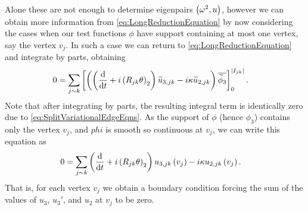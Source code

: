 Alone these are not enough to determine eigenpairs $\left( \omega^2, u \right)$, however we can obtain more information from \eqref{eq:LongReductionEquation} by now considering the cases when our test functions $\phi$ have support containing at most one vertex, say the vertex $v_j$.
In such a case we can return to \eqref{eq:LongReductionEquation} and integrate by parts, obtaining 
\begin{align*}
	0 &= \sum_{j\sim k} \left[  \left(  \left( \dfrac{\mathrm{d}}{\mathrm{d}t} + i\left( R_{jk}\theta \right)_2 \right)\widetilde{u}_{3,jk} - i\kappa\widetilde{u}_{2,jk}  \right)\overline{\widetilde{\phi}_3}  \right]_0^{\left\lvert I_{jk} \right\rvert}.
\end{align*}
Note that after integrating by parts, the resulting integral term is identically zero due to \eqref{eq:SplitVariationalEdgeEqns}.
As the support of $\phi$ (hence $\phi_3$) contains only the vertex $v_j$, and $phi$ is smooth so continuous at $v_j$, we can write this equation as
\begin{align*}
	0 &= \sum_{j\sim k} \left( \dfrac{\mathrm{d}}{\mathrm{d}t} + i\left( R_{jk}\theta \right)_2 \right)u_{3,jk}\left( v_j \right) - i\kappa u_{2,jk}\left( v_j \right).
\end{align*}
That is, for each vertex $v_j$ we obtain a boundary condition forcing the sum of the values of $u_3$, $u_3'$, and $u_2$ at $v_j$ to be zero. \newline

